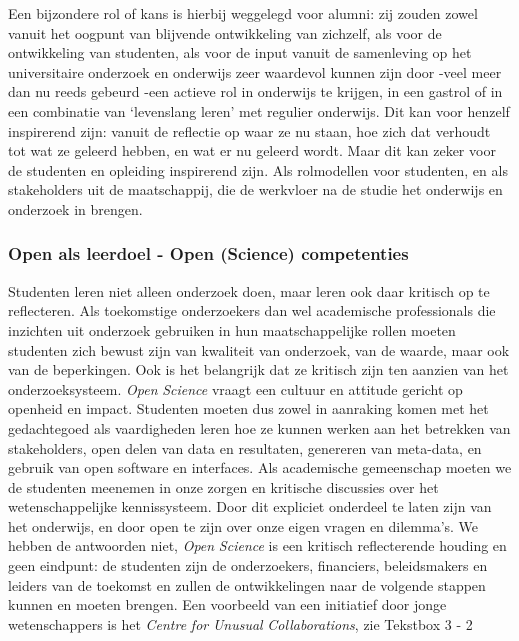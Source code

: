 \documentclass[smallauthor, chapterhaspagenum, nochapterinheader, pagenuminheader,  bigchapnum,medium2, tocpages,  garamond, titleinheader]{jote-book}
\begin{document}
	Een bijzondere rol of kans is hierbij weggelegd voor alumni: zij zouden zowel vanuit het oogpunt van blijvende ontwikkeling van zichzelf, als voor de ontwikkeling van studenten, als voor de input vanuit de samenleving op het universitaire onderzoek en onderwijs zeer waardevol kunnen zijn door -veel meer dan nu reeds gebeurd -een actieve rol in onderwijs te krijgen, in een gastrol of in een combinatie van ‘levenslang leren' met regulier onderwijs. Dit kan voor henzelf inspirerend zijn: vanuit de reflectie op waar ze nu staan, hoe zich dat verhoudt tot wat ze geleerd hebben, en wat er nu geleerd wordt. Maar dit kan zeker voor de studenten en opleiding inspirerend zijn. Als rolmodellen voor studenten, en als stakeholders uit de maatschappij, die de werkvloer na de studie het onderwijs en onderzoek in brengen.



	\subsubsection{Open als leerdoel - Open (Science) competenties}



	Studenten leren niet alleen onderzoek doen, maar leren ook daar kritisch op te reflecteren. Als toekomstige onderzoekers dan wel academische professionals die inzichten uit onderzoek gebruiken in hun maatschappelijke rollen moeten studenten zich bewust zijn van kwaliteit van onderzoek, van de waarde, maar ook van de beperkingen. Ook is het belangrijk dat ze kritisch zijn ten aanzien van het onderzoeksysteem. \emph{Open }\emph{Science} vraagt een cultuur en attitude gericht op openheid en impact. Studenten moeten dus zowel in aanraking komen met het gedachtegoed als vaardigheden leren hoe ze kunnen werken aan het betrekken van stakeholders, open delen van data en resultaten, genereren van meta-data, en gebruik van open software en interfaces. Als academische gemeenschap moeten we de studenten meenemen in onze zorgen en kritische discussies over het wetenschappelijke kennissysteem. Door dit expliciet onderdeel te laten zijn van het onderwijs, en door open te zijn over onze eigen vragen en dilemma's. We hebben de antwoorden niet, \emph{Open }\emph{Science} is een kritisch reflecterende houding en geen eindpunt: de studenten zijn de onderzoekers, financiers, beleidsmakers en leiders van de toekomst en zullen de ontwikkelingen naar de volgende stappen kunnen en moeten brengen. Een voorbeeld van een initiatief door jonge wetenschappers is het \emph{Centre }\emph{for}\emph{ }\emph{Unusual}\emph{ }\emph{Collaborations}, zie Tekstbox 3 - 2
\end{document}

